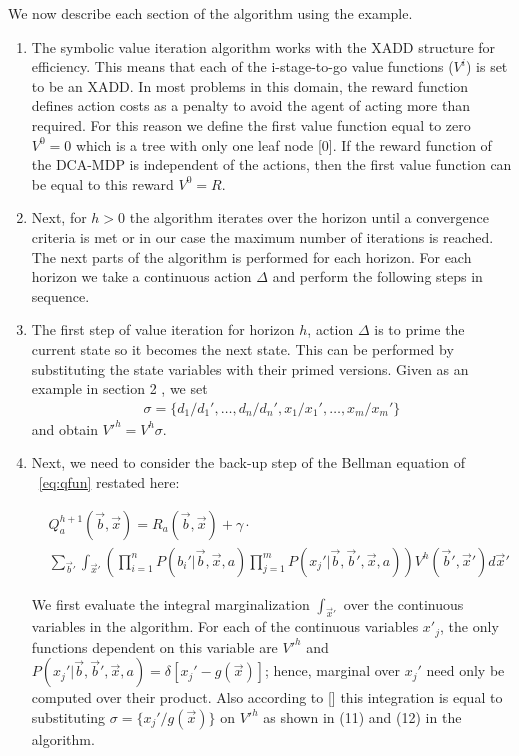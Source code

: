 \documentclass[letterpaper]{article}
\renewcommand{\-}{\text{-}}
\begin{document}
We now describe each section of the algorithm using the \InventoryControl example. 
\begin{enumerate}
\item The symbolic value iteration algorithm works with the XADD structure for efficiency. This means that each of the i-stage-to-go value functions ($V^i$) is set to be an XADD. In most problems in this domain, the reward function defines action costs as a penalty to avoid the agent of acting more than required. For this reason we define the first value function equal to zero $V^0=0$ which is a tree with only one leaf node [0]. If the reward function of the DCA-MDP is independent of the actions, then the first value function can be equal to this reward $V^0=R$.\\

\item Next, for $h > 0$ the algorithm iterates over the horizon until a convergence criteria is met or in our case the maximum number of iterations is reached. The next parts of the algorithm is performed for each horizon. For each horizon we take a continuous action $\Delta$ and perform the following steps in sequence.\\

\item The first step of value iteration for horizon $h$, action $\Delta$ is to prime the current state so it becomes the next state. This can be performed by substituting the state variables with their primed versions. Given as an example in section 2 , we set
{\footnotesize
\begin{align*}
\sigma = \{ d_1 / d_1', \ldots, d_n / d_n', x_1 / x_1', \ldots, x_m / x_m' \}
\end{align*}
}
and obtain $V'^{h} = V^{h}\sigma$.

\item Next, we need to consider the back-up step of the Bellman equation of ~\eqref{eq:qfun} restated here: 
 \vspace{-3mm}
 
 {\footnotesize
 \begin{align}
 & Q_a^{h+1}(\vec{b},\vec{x}) = R_a(\vec{b},\vec{x}) + \gamma \cdot \label{eq:qfun} \\ 
 & \sum_{\vec{b}'} \int_{\vec{x}'} \left( \prod_{i=1}^n P(b_i'|\vec{b},\vec{x},a) \prod_{j=1}^m P(x_j'|\vec{b},\vec{b}',\vec{x},a) \right) V^h(\vec{b}',\vec{x}') d\vec{x}' \nonumber
 \end{align}}
 
We first evaluate the integral marginalization $\int_{\vec{x}'}$ over the continuous variables in the algorithm. For each of the continuous variables $x'_j$, the only functions dependent on this variable are $V'^{h}$
and $P(x_j'|\vec{b},\vec{b}',\vec{x},a) = \delta[x_j' - g(\vec{x})]$; 
hence, marginal over $x_j'$ need only be computed over
their product. Also according to [] this integration is equal to substituting $\sigma = \{ x_j' / g(\vec{x}) \}$
on $V'^{h}$ as shown in (11) and (12) in the algorithm.


\end{enumerate}
\end{document}
